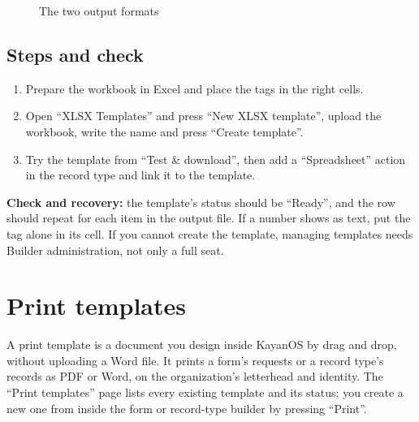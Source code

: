 \begin{figure}[H]
\centering
{}
\rclegend
\caption{The two output formats}
\label{fig:builder-xlsx-outputs}
\end{figure}

\subsection{Steps and check}
\begin{enumerate}
\item Prepare the workbook in Excel and place the tags in the right cells.
\item Open “XLSX Templates” and press “New XLSX template”, upload the workbook, write the name and press “Create template”.
\item Try the template from “Test \& download”, then add a “Spreadsheet” action in the record type and link it to the template.
\end{enumerate}

\textbf{Check and recovery:} the template's status should be “Ready”, and the row should repeat for each item in the output file. If a number shows as text, put the tag alone in its cell. If you cannot create the template, managing templates needs Builder administration, not only a full seat.

\clearpage
\section{Print templates}
\label{sec:builder-feature-print-templates}

A print template is a document you design inside KayanOS by drag and drop, without uploading a Word file. It prints a form's requests or a record type's records as PDF or Word, on the organization's letterhead and identity. The “Print templates” page lists every existing template and its status; you create a new one from inside the form or record-type builder by pressing “Print”.

